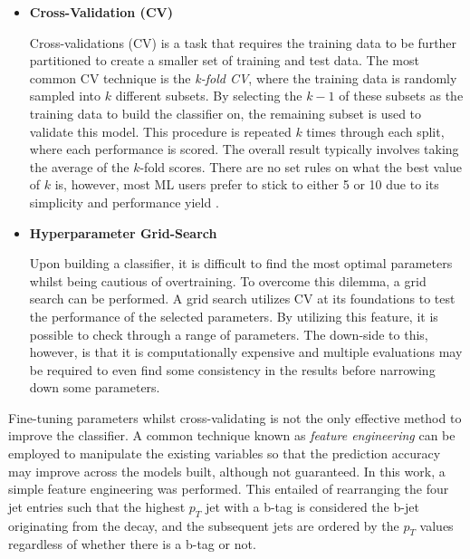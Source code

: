 \begin{itemize}
    \item \textbf{Cross-Validation (CV)} \par
    Cross-validations (CV) is a task that requires the training data to be further partitioned to create a smaller set of training and test data. The most common CV technique is the \textit{k-fold CV}, where the training data is randomly sampled into $k$ different subsets. By selecting the $k-1$ of these subsets as the training data to build the classifier on, the remaining subset is used to validate this model. This procedure is repeated $k$ times through each split, where each performance is scored. The overall result typically involves taking the average of the $k$-fold scores.  There are no set rules on what the best value of $k$ is, however, most ML users prefer to stick to either 5 or 10 due to its simplicity and performance yield \cite{james2013introduction}. \\
    
    \item \textbf{Hyperparameter Grid-Search} \par
    Upon building a classifier, it is difficult to find the most optimal parameters whilst being cautious of overtraining. To overcome this dilemma, a grid search can be performed. A grid search utilizes CV at its foundations to test the performance of the selected parameters. By utilizing this feature, it is possible to check through a range of parameters. The down-side to this, however, is that it is computationally expensive and multiple evaluations may be required to even find some consistency in the results before narrowing down some parameters. \\
    
\end{itemize}


Fine-tuning parameters whilst cross-validating is not the only effective method to improve the classifier. A common technique known as \textit{feature engineering} can be employed to manipulate the existing variables so that the prediction accuracy may improve across the models built, although not guaranteed. In this work, a simple feature engineering was performed. This entailed of rearranging the four jet entries such that the highest $p_T$ jet with a b-tag is considered the b-jet originating from the decay, and the subsequent jets are ordered by the $p_T$ values regardless of whether there is a b-tag or not. \\

